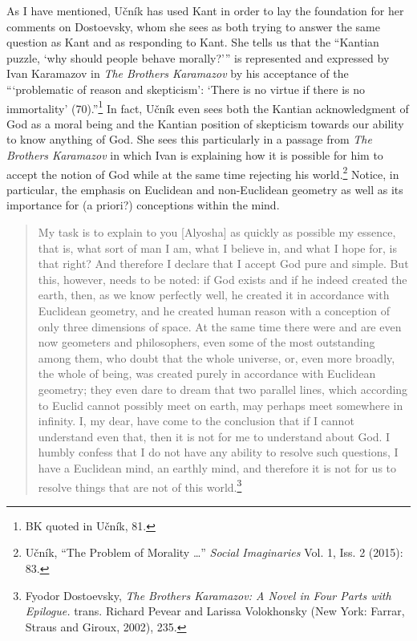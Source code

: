\documentclass[12pt]{article}
\begin{document}
	As I have mentioned, U\v{c}n\'{i}k has used Kant in order to lay the foundation for her comments on Dostoevsky, whom she sees as both trying to answer the same question as Kant and as responding to Kant. She tells us that the ``Kantian puzzle, `why should people behave morally?'\thinspace'' is represented and expressed by Ivan Karamazov in \emph{The Brothers Karamazov} by his acceptance of the ``\thinspace`problematic of reason and skepticism': `There is no virtue if there is no immortality' (70).''\footnote{BK quoted in U\v{c}n\'{i}k, 81.} In fact, U\v{c}n\'{i}k even sees both the Kantian acknowledgment of God as a moral being and the Kantian position of skepticism towards our ability to know anything of God. She sees this particularly in a passage from \emph{The Brothers Karamazov} in which Ivan is explaining how it is possible for him to accept the notion of God while at the same time rejecting his world.\footnote{U\v{c}n\'{i}k, ``The Problem of Morality \ldots'' \emph{Social Imaginaries} Vol. 1, Iss. 2 (2015): 83.} Notice, in particular, the emphasis on Euclidean and non-Euclidean geometry as well as its importance for (a priori?) conceptions within the mind. 
	
	\begin{quote}
	\singlespacing
	\footnotesize
	My task is to explain to you [Alyosha] as quickly as possible my essence, that is, what sort of man I am, what I believe in, and what I hope for, is that right? And therefore I declare that I accept God pure and simple. But this, however, needs to be noted: if God exists and if he indeed created the earth, then, as we know perfectly well, he created it in accordance with Euclidean geometry, and he created human reason with a conception of only three dimensions of space. At the same time there were and are even now geometers and philosophers, even some of the most outstanding among them, who doubt that the whole universe, or, even more broadly, the whole of being, was created purely in accordance with Euclidean geometry; they even dare to dream that two parallel lines, which according to Euclid cannot possibly meet on earth, may perhaps meet somewhere in infinity. I, my dear, have come to the conclusion that if I cannot understand even that, then it is not for me to understand about God. I humbly confess that I do not have any ability to resolve such questions, I have a Euclidean mind, an earthly mind, and therefore it is not for us to resolve things that are not of this world.\footnote{Fyodor Dostoevsky, \emph{The Brothers Karamazov: A Novel in Four Parts with Epilogue.} trans. Richard Pevear and Larissa Volokhonsky (New York: Farrar, Straus and Giroux, 2002), 235.}
	\end{quote}
	
\end{document}
